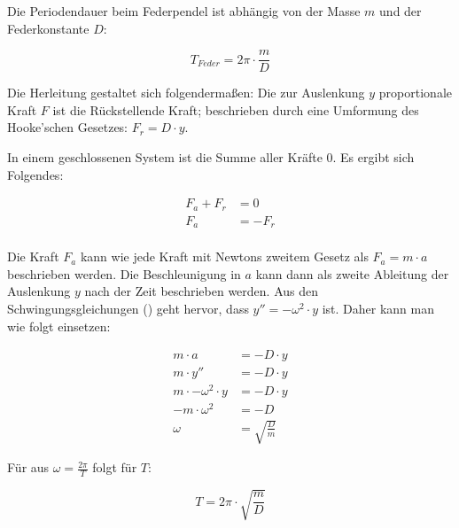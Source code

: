 Die Periodendauer beim Federpendel ist abhängig von der Masse $m$ und der Federkonstante $D$:

\begin{equation*}
	T_{Feder}=2\pi \cdot \frac{m}{D}
\end{equation*}

Die Herleitung gestaltet sich folgendermaßen: Die zur Auslenkung $y$ proportionale Kraft $F$ ist die Rückstellende Kraft; beschrieben durch eine Umformung des Hooke'schen Gesetzes: $F_{r}=D \cdot y$. 

In einem geschlossenen System ist die Summe aller Kräfte $0$. Es ergibt sich Folgendes:

\begin{align*}
	F_a + F_r &= 0 \\
	F_a &= -F_r \\
\end{align*}

Die Kraft $F_a$ kann wie jede Kraft mit Newtons zweitem Gesetz als $F_a=m \cdot a$ beschrieben werden. Die Beschleunigung in $a$ kann dann als zweite Ableitung der Auslenkung $y$ nach der Zeit beschrieben werden. Aus den Schwingungsgleichungen () geht hervor, dass $y''=-\omega^{2} \cdot y$ ist. Daher kann man wie folgt einsetzen:

\begin{align*}
	m \cdot a &= -D \cdot y \\
	m \cdot y'' &= -D \cdot y \\
	m \cdot -\omega^{2} \cdot y &= -D \cdot y \\
	- m \cdot \omega^{2} &= -D \\
	\omega &= \sqrt{\frac{D}{m}}
\end{align*}

Für aus $\omega=\frac{2\pi}{T}$ folgt für $T$:

\begin{equation*}
	T = 2\pi \cdot \sqrt{\frac{m}{D}}
\end{equation*}











